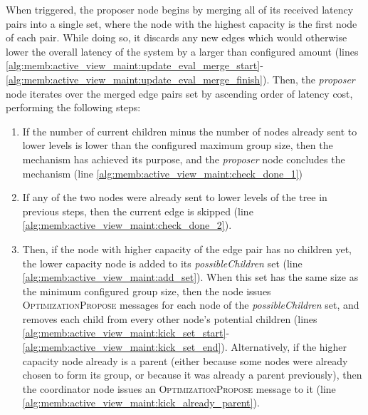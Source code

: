 When triggered, the proposer node begins by merging all of its received latency pairs into a single set, where the node with the highest capacity is the first node of each pair. While doing so, it discards any new edges which would otherwise lower the overall latency of the system by a larger than configured amount (lines \ref{alg:memb:active_view_maint:update_eval_merge_start}-\ref{alg:memb:active_view_maint:update_eval_merge_finish}). Then, the \textit{proposer} node iterates over the merged edge pairs set by ascending order of latency cost, performing the following steps:

\begin{enumerate}
    \item If the number of current children minus the number of nodes already sent to lower levels is lower than the configured maximum group size, then the mechanism has achieved its purpose, and the \textit{proposer} node concludes the mechanism (line \ref{alg:memb:active_view_maint:check_done_1})
    
    \item If any of the two nodes were already sent to lower levels of the tree in previous steps, then the current edge is skipped (line \ref{alg:memb:active_view_maint:check_done_2}).
    
    \item Then, if the node with higher capacity of the edge pair has no children yet, the lower capacity node is added to its \textit{possibleChildren} set (line \ref{alg:memb:active_view_maint:add_set}). When this set has the same size as the minimum configured group size, then the node issues \textsc{OptimizationPropose} messages for each node of the \textit{possibleChildren} set, and removes each child from every other node's potential children (lines \ref{alg:memb:active_view_maint:kick_set_start}-\ref{alg:memb:active_view_maint:kick_set_end}). Alternatively, if the higher capacity node already is a parent (either because some nodes were already chosen to form its group, or because it was already a parent previously), then the coordinator node issues an \textsc{OptimizationPropose} message to it (line \ref{alg:memb:active_view_maint:kick_already_parent}).
\end{enumerate}

